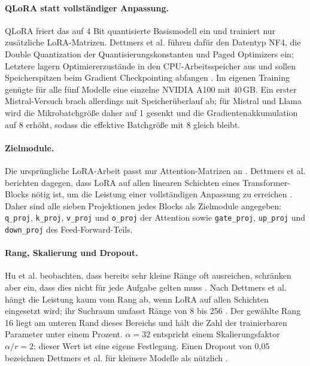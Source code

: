 \documentclass[12pt,twoside=false,a4paper,parskip]{scrbook}
\begin{document}
\paragraph{QLoRA statt vollständiger Anpassung.} QLoRA friert das auf 4 Bit quantisierte Basismodell ein und trainiert nur zusätzliche LoRA-Matrizen. Dettmers et al. führen dafür den Datentyp NF4, die Double Quantization der Quantisierungskonstanten und Paged Optimizers ein; Letztere lagern Optimiererzustände in den CPU-Arbeitsspeicher aus und sollen Speicherspitzen beim Gradient Checkpointing abfangen \cite{dettmers2023qlora}. Im eigenen Training genügte für alle fünf Modelle eine einzelne NVIDIA A100 mit 40\,GB. Ein erster Mistral-Versuch brach allerdings mit Speicherüberlauf ab; für Mistral und Llama wird die Mikrobatchgröße daher auf 1 gesenkt und die Gradientenakkumulation auf 8 erhöht, sodass die effektive Batchgröße mit 8 gleich bleibt.

\paragraph{Zielmodule.} Die ursprüngliche LoRA-Arbeit passt nur Attention-Matrizen an \cite{hu2021lora}. Dettmers et al. berichten dagegen, dass LoRA auf allen linearen Schichten eines Transformer-Blocks nötig ist, um die Leistung einer vollständigen Anpassung zu erreichen \cite{dettmers2023qlora}. Daher sind alle sieben Projektionen jedes Blocks als Zielmodule angegeben: \texttt{q\_proj}, \texttt{k\_proj}, \texttt{v\_proj} und \texttt{o\_proj} der Attention sowie \texttt{gate\_proj}, \texttt{up\_proj} und \texttt{down\_proj} des Feed-Forward-Teils.

\paragraph{Rang, Skalierung und Dropout.} Hu et al. beobachten, dass bereits sehr kleine Ränge oft ausreichen, schränken aber ein, dass dies nicht für jede Aufgabe gelten muss \cite{hu2021lora}. Nach Dettmers et al. hängt die Leistung kaum vom Rang ab, wenn LoRA auf allen Schichten eingesetzt wird; ihr Suchraum umfasst Ränge von 8 bis 256 \cite{dettmers2023qlora}. Der gewählte Rang 16 liegt am unteren Rand dieses Bereichs und hält die Zahl der trainierbaren Parameter unter einem Prozent. $\alpha=32$ entspricht einem Skalierungsfaktor $\alpha/r=2$; dieser Wert ist eine eigene Festlegung. Einen Dropout von 0{,}05 bezeichnen Dettmers et al. für kleinere Modelle als nützlich \cite{dettmers2023qlora}.
\end{document}
